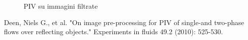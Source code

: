 \documentclass[a4paper]{article}
\begin{document}
 \begin{figure}[h]
 	\centering
 	\caption{\label{fig:filt_piv}PIV su immagini filtrate}
 \end{figure}




\begin{thebibliography}{9}
Deen, Niels G., et al. "On image pre-processing for PIV of single-and two-phase flows over reflecting objects." Experiments in fluids 49.2 (2010): 525-530.

\end{thebibliography}
\end{document}
